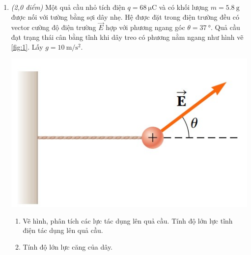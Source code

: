 \begin{enumerate}[label=\bfseries Câu \arabic*:]
	\item \textit{(2,0 điểm)} Một quả cầu nhỏ tích điện $q=\SI{68}
{\micro\coulomb}$ và có khối lượng $m=\SI{5.8}{\gram}$ được nối với tường bằng sợi dây nhẹ. Hệ được đặt trong điện trường đều có vector cường độ điện trường $\vec{E}$ hợp với phương ngang góc $\theta=\SI{37}{\degree}$. Quả cầu đạt trạng thái cân bằng tĩnh khi dây treo có phương nằm ngang như hình vẽ \ref{fig:1}. Lấy $g=\SI{10}{\meter/\second^2}$.
\begin{center}
	\includegraphics[width=0.35\linewidth]{../figs/PH11-MidSem2-05-1}
	\label{fig:1}
\end{center}
\begin{enumerate}[label=\alph*)]
	\item Vẽ hình, phân tích các lực tác dụng lên quả cầu. Tính độ lớn lực tĩnh điện tác dụng lên quả cầu.
	\item Tính độ lớn lực căng của dây.
\end{enumerate}



\end{enumerate}

